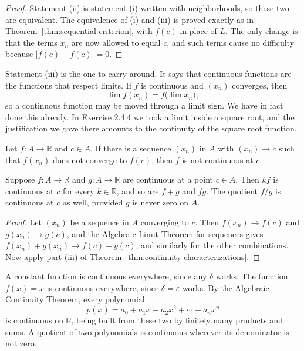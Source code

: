 \begin{proof}
Statement (ii) is statement (i) written with neighborhoods, so these two are equivalent.  The equivalence of (i) and (iii) is proved exactly as in Theorem~\ref{thm:sequential-criterion}, with $f(c)$ in place of $L$.  The only change is that the terms $x_n$ are now allowed to equal $c$, and such terms cause no difficulty because $|f(c) - f(c)| = 0$.
\end{proof}

Statement (iii) is the one to carry around.  It says that continuous functions are the functions that respect limits.  If $f$ is continuous and $(x_n)$ converges, then
\[ \lim f(x_n) = f\big(\lim x_n\big), \]
so a continuous function may be moved through a limit sign.  We have in fact done this already.  In Exercise 2.4.4 we took a limit inside a square root, and the justification we gave there amounts to the continuity of the square root function.

\begin{corollary}\label{cor:discontinuity-criterion}
Let $f : A \to \mathbb{R}$ and $c \in A$.  If there is a sequence $(x_n)$ in $A$ with $(x_n) \to c$ such that $f(x_n)$ does not converge to $f(c)$, then $f$ is not continuous at $c$.
\end{corollary}

\begin{theorem}\label{thm:algebraic-continuity}
Suppose $f : A \to \mathbb{R}$ and $g : A \to \mathbb{R}$ are continuous at a point $c \in A$.  Then $kf$ is continuous at $c$ for every $k \in \mathbb{R}$, and so are $f + g$ and $fg$.  The quotient $f/g$ is continuous at $c$ as well, provided $g$ is never zero on $A$.
\end{theorem}

\begin{proof}
Let $(x_n)$ be a sequence in $A$ converging to $c$.  Then $f(x_n) \to f(c)$ and $g(x_n) \to g(c)$, and the Algebraic Limit Theorem for sequences gives $f(x_n) + g(x_n) \to f(c) + g(c)$, and similarly for the other combinations.  Now apply part (iii) of Theorem~\ref{thm:continuity-characterizations}.
\end{proof}

\begin{example}
A constant function is continuous everywhere, since any $\delta$ works.  The function $f(x) = x$ is continuous everywhere, since $\delta = \varepsilon$ works.  By the Algebraic Continuity Theorem, every polynomial
\[ p(x) = a_0 + a_1 x + a_2 x^2 + \cdots + a_n x^n \]
is continuous on $\mathbb{R}$, being built from these two by finitely many products and sums.  A quotient of two polynomials is continuous wherever its denominator is not zero.
\end{example}

